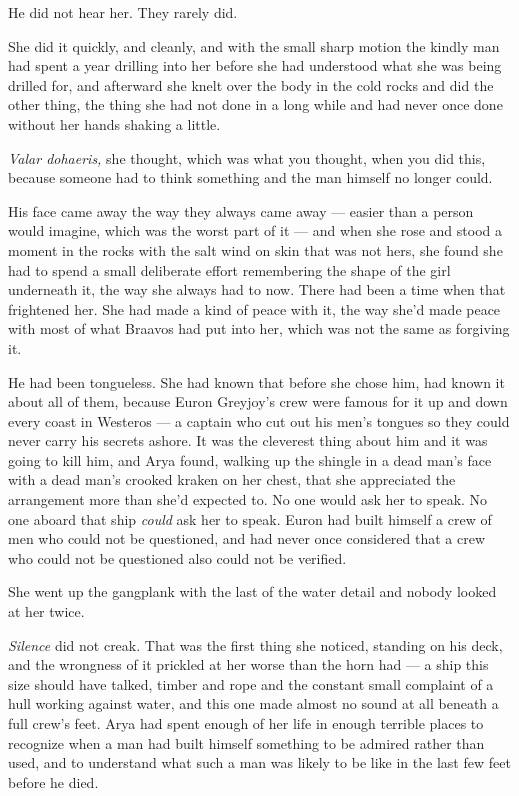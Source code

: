 He did not hear her. They rarely did.

She did it quickly, and cleanly, and with the small sharp motion the kindly man had spent a year drilling into her before she had understood what she was being drilled for, and afterward she knelt over the body in the cold rocks and did the other thing, the thing she had not done in a long while and had never once done without her hands shaking a little.

\textit{Valar dohaeris,} she thought, which was what you thought, when you did this, because someone had to think something and the man himself no longer could.

His face came away the way they always came away — easier than a person would imagine, which was the worst part of it — and when she rose and stood a moment in the rocks with the salt wind on skin that was not hers, she found she had to spend a small deliberate effort remembering the shape of the girl underneath it, the way she always had to now. There had been a time when that frightened her. She had made a kind of peace with it, the way she’d made peace with most of what Braavos had put into her, which was not the same as forgiving it.

He had been tongueless. She had known that before she chose him, had known it about all of them, because Euron Greyjoy’s crew were famous for it up and down every coast in Westeros — a captain who cut out his men’s tongues so they could never carry his secrets ashore. It was the cleverest thing about him and it was going to kill him, and Arya found, walking up the shingle in a dead man’s face with a dead man’s crooked kraken on her chest, that she appreciated the arrangement more than she’d expected to. No one would ask her to speak. No one aboard that ship \textit{could} ask her to speak. Euron had built himself a crew of men who could not be questioned, and had never once considered that a crew who could not be questioned also could not be verified.

She went up the gangplank with the last of the water detail and nobody looked at her twice.

\sceneBreak

\textit{Silence} did not creak. That was the first thing she noticed, standing on his deck, and the wrongness of it prickled at her worse than the horn had — a ship this size should have talked, timber and rope and the constant small complaint of a hull working against water, and this one made almost no sound at all beneath a full crew’s feet. Arya had spent enough of her life in enough terrible places to recognize when a man had built himself something to be admired rather than used, and to understand what such a man was likely to be like in the last few feet before he died.

